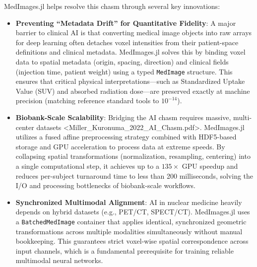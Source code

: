 \documentclass[10pt,letterpaper]{article}
\begin{document}
MedImages.jl helps resolve this chasm through several key innovations:
\begin{itemize}
    \item \textbf{Preventing ``Metadata Drift'' for Quantitative Fidelity}: A major barrier to clinical AI is that converting medical image objects into raw arrays for deep learning often detaches voxel intensities from their patient-space definitions and clinical metadata. MedImages.jl solves this by binding voxel data to spatial metadata (origin, spacing, direction) and clinical fields (injection time, patient weight) using a typed \texttt{MedImage} structure. This ensures that critical physical interpretations—such as Standardized Uptake Value (SUV) and absorbed radiation dose—are preserved exactly at machine precision (matching reference standard tools to $10^{-14}$).
    \item \textbf{Biobank-Scale Scalability}: Bridging the AI chasm requires massive, multi-center datasets <Miller_Kuronuma_2022_AI_Chasm.pdf>. MedImages.jl utilizes a fused affine preprocessing strategy combined with HDF5-based storage and GPU acceleration to process data at extreme speeds. By collapsing spatial transformations (normalization, resampling, centering) into a single computational step, it achieves up to a $135\times$ GPU speedup and reduces per-subject turnaround time to less than 200 milliseconds, solving the I/O and processing bottlenecks of biobank-scale workflows.
    \item \textbf{Synchronized Multimodal Alignment}: AI in nuclear medicine heavily depends on hybrid datasets (e.g., PET/CT, SPECT/CT). MedImages.jl uses a \texttt{BatchedMedImage} container that applies identical, synchronized geometric transformations across multiple modalities simultaneously without manual bookkeeping. This guarantees strict voxel-wise spatial correspondence across input channels, which is a fundamental prerequisite for training reliable multimodal neural networks.
\end{itemize}
\end{document}

